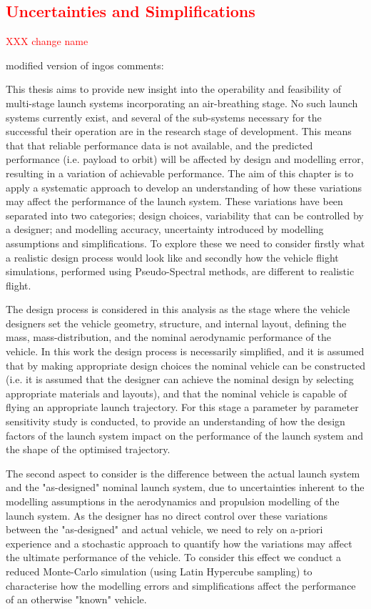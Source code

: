 \textcolor{red}{
\chapter{Uncertainties and Simplifications}
}
\textcolor{red}{XXX change name}

modified version of ingos comments:

This thesis aims to provide new insight into the operability and feasibility of multi-stage launch systems incorporating an air-breathing stage.
No such launch systems currently exist, and several of the sub-systems necessary for the successful their operation are in the research stage of development.
This means that that reliable performance data is not available, and the predicted performance (i.e. payload to orbit) will be affected by design and modelling error, resulting in a variation of achievable performance. 
The aim of this chapter is to apply a systematic approach to develop an understanding of how these variations may affect the performance of the launch system. These variations have been separated into two categories; design choices, variability that can be controlled by a designer; and modelling accuracy, uncertainty introduced by modelling assumptions and simplifications. To explore these we need to consider firstly what a realistic design process would look like and secondly how the vehicle flight simulations, performed using Pseudo-Spectral methods, are different to realistic flight. 



The design process is considered in this analysis as the stage where the vehicle designers set the vehicle geometry, structure, and internal layout, defining the mass, mass-distribution, and the nominal aerodynamic performance of the vehicle. In this work the design process is necessarily simplified, and it is assumed that by making appropriate design choices the nominal vehicle can be constructed (i.e. it is assumed that the designer can achieve the nominal design by selecting appropriate materials and layouts), and that the nominal vehicle is capable of flying an appropriate launch trajectory. For this stage a parameter by parameter sensitivity study is conducted, to provide an understanding of how the design factors of the launch system impact on the performance of the launch system and the shape of the optimised trajectory. 



The second aspect to consider is the difference between the actual launch system and the "as-designed" nominal launch system, due to uncertainties inherent to the modelling assumptions in the aerodynamics and propulsion modelling of the launch system. As the designer has no direct control over these variations between the "as-designed" and actual vehicle, we need to rely on a-priori experience and a stochastic approach to quantify how the variations may affect the ultimate performance of the vehicle. To consider this effect we conduct a reduced Monte-Carlo simulation (using Latin Hypercube sampling) to characterise how the modelling errors and simplifications affect the performance of an otherwise "known" vehicle. 


